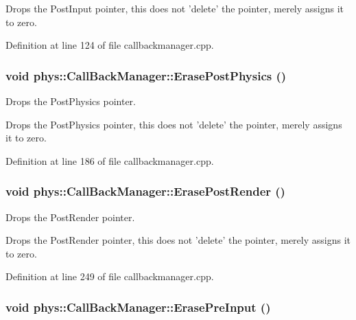 Drops the PostInput pointer, this does not 'delete' the pointer, merely assigns it to zero. 

Definition at line 124 of file callbackmanager.cpp.

\hypertarget{classphys_1_1CallBackManager_a2d03573a93606e9d3fcd7adad5c8c397}{
\subsubsection[{ErasePostPhysics}]{\setlength{\rightskip}{0pt plus 5cm}void phys::CallBackManager::ErasePostPhysics ()}}
\label{d1/d47/classphys_1_1CallBackManager_a2d03573a93606e9d3fcd7adad5c8c397}


Drops the PostPhysics pointer. 

Drops the PostPhysics pointer, this does not 'delete' the pointer, merely assigns it to zero. 

Definition at line 186 of file callbackmanager.cpp.

\hypertarget{classphys_1_1CallBackManager_a0eef22a8df4dc87289a18f0e6a1d0baf}{
\subsubsection[{ErasePostRender}]{\setlength{\rightskip}{0pt plus 5cm}void phys::CallBackManager::ErasePostRender ()}}
\label{d1/d47/classphys_1_1CallBackManager_a0eef22a8df4dc87289a18f0e6a1d0baf}


Drops the PostRender pointer. 

Drops the PostRender pointer, this does not 'delete' the pointer, merely assigns it to zero. 

Definition at line 249 of file callbackmanager.cpp.

\hypertarget{classphys_1_1CallBackManager_ae3da6f1eb10cdf4d8551aaeeda73053c}{
\subsubsection[{ErasePreInput}]{\setlength{\rightskip}{0pt plus 5cm}void phys::CallBackManager::ErasePreInput ()}}
\label{d1/d47/classphys_1_1CallBackManager_ae3da6f1eb10cdf4d8551aaeeda73053c}


